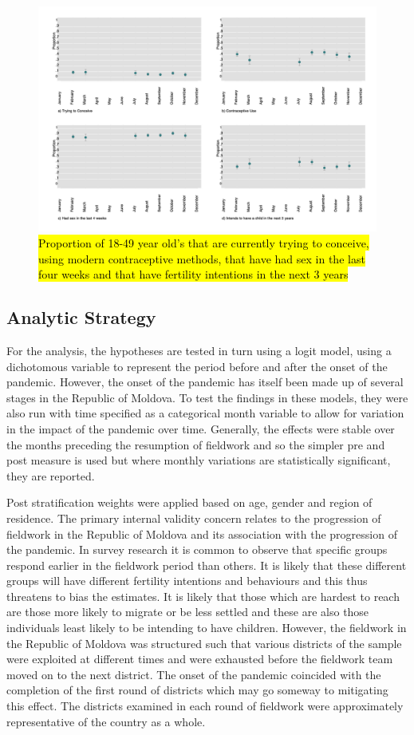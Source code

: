 \documentclass[10pt,letterpaper]{article}
\begin{document}
\begin{figure}
\centering
\includegraphics[width=\textwidth]{fig3.png}
\caption{\hl{Proportion of 18-49 year old's that are currently trying to conceive, using modern contraceptive methods, that have had sex in the last four weeks and that have fertility intentions in the next 3 years}}
\label{fig:deps_month}
\end{figure}
\subsection*{Analytic Strategy}
For the analysis, the hypotheses are tested in turn using a logit model, using a dichotomous variable to represent the period before and after the onset of the pandemic. However, the onset of the pandemic has itself been made up of several stages in the Republic of Moldova. To test the findings in these models, they were also run with time specified as a categorical month variable to allow for variation in the impact of the pandemic over time. Generally, the effects were stable over the months preceding the resumption of fieldwork and so the simpler pre and post measure is used but where monthly variations are statistically significant, they are reported. 

Post stratification weights were applied based on age, gender and region of residence. The primary internal validity concern relates to the progression of fieldwork in the Republic of Moldova and its association with the progression of the pandemic. In survey research it is common to observe that specific groups respond earlier in the fieldwork period than others. It is likely that these different groups will have different fertility intentions and behaviours and this thus threatens to bias the estimates. It is likely that those which are hardest to reach are those more likely to migrate or be less settled and these are also those individuals least likely to be intending to have children. However, the fieldwork in the Republic of Moldova was structured such that various districts of the sample were exploited at different times and were exhausted before the fieldwork team moved on to the next district. The onset of the pandemic coincided with the completion of the first round of districts which may go someway to mitigating this effect. The districts examined in each round of fieldwork were approximately representative of the country as a whole.
\end{document}
